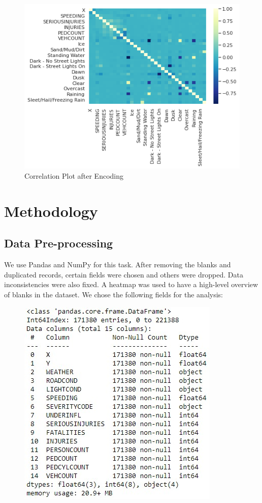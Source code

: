 \documentclass{article}
\begin{document}
\begin{figure}[H]
  \centering
  \includegraphics[scale=0.65]{heat2.png}
  \caption{Correlation Plot after Encoding}
\end{figure}

\section{Methodology}

\subsection{Data Pre-processing}

We use Pandas and NumPy for this task. After removing the blanks and duplicated records, certain fields were chosen and others were dropped. Data inconsistencies were also fixed. A heatmap was used to have a high-level overview of blanks in the dataset. We chose the following fields for the analysis:

\begin{figure}[H]
  \centering
  \includegraphics[scale=0.65]{finalfields.jpg}
\end{figure}
\end{document}
